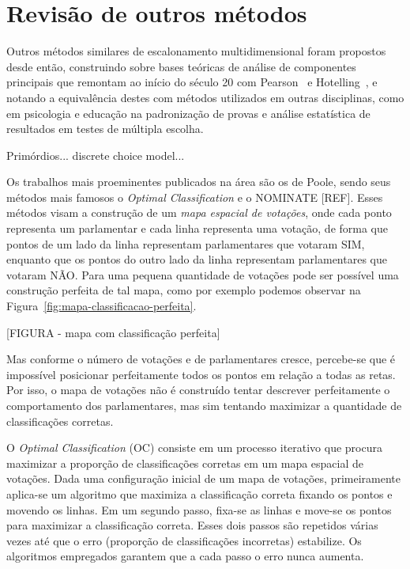 \documentclass[a4paper, 12pt]{article}
\newcommand\nay{NÃO\xspace}
\newcommand\yea{SIM\xspace}
\begin{document}
\section{Revisão de outros métodos}
\label{sec:revbib}


Outros métodos similares de escalonamento multidimensional foram propostos desde então, construindo sobre bases teóricas de análise de componentes principais que remontam ao início do século 20 com Pearson~\cite{pearson1901} e Hotelling~\cite{hotelling1933}, e notando a equivalência destes com métodos utilizados em outras disciplinas, como em psicologia e educação na padronização de provas e análise estatística de resultados em testes de múltipla escolha.

Primórdios... discrete choice model...

Os trabalhos mais proeminentes publicados na área são os de Poole, sendo seus métodos mais famosos o \emph{Optimal Classification} e o NOMINATE [REF]. Esses métodos visam a construção de um \emph{mapa espacial de votações}, onde cada ponto representa um parlamentar e cada linha representa uma votação, de forma que pontos de um lado da linha representam parlamentares que votaram \yea, enquanto que os pontos do outro lado da linha representam parlamentares que votaram \nay. Para uma pequena quantidade de votações pode ser possível uma construção perfeita de tal mapa, como por exemplo podemos observar na Figura~\ref{fig:mapa-classificacao-perfeita}.

[FIGURA - mapa com classificação perfeita]

Mas conforme o número de votações e de parlamentares cresce, percebe-se que é impossível posicionar perfeitamente todos os pontos em relação a todas as retas. Por isso, o mapa de votações não é construído tentar descrever perfeitamente o comportamento dos parlamentares, mas sim tentando maximizar a quantidade de classificações corretas.

O \emph{Optimal Classification} (OC) consiste em um processo iterativo que procura maximizar a proporção de classificações corretas em um mapa espacial de votações. Dada uma configuração inicial de um mapa de votações, primeiramente aplica-se um algoritmo que maximiza a classificação correta fixando os pontos e movendo os linhas. Em um segundo passo, fixa-se as linhas e move-se os pontos para maximizar a classificação correta. Esses dois passos são repetidos várias vezes até que o erro (proporção de classificações incorretas) estabilize. Os algoritmos empregados garantem que a cada passo o erro nunca aumenta.
\end{document}
